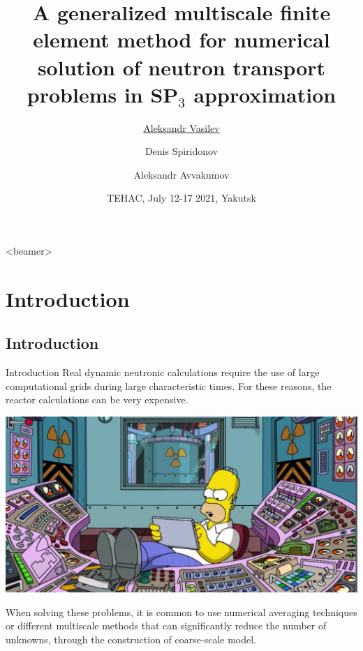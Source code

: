\documentclass[10pt,pdf,hyperref={unicode}]{beamer}
\title[] %
{
	A generalized multiscale finite element method for numerical solution of neutron transport problems in SP$_3$ approximation
}
\author[] %
{
	\underline{Aleksandr Vasilev \inst{1}} \\
	\and Denis Spiridonov \inst{1} 
	\and Aleksandr Avvakumov \inst{2}
}
\institute[] %
{
	\inst{1} North-Eastern Federal University, Yakutsk, Russia \\
	\inst{2} National Research Center \textquotedblleft Kurchatov Institute\grqq, Moscow, Russia
}
\date[July 12-17, 2021] %
{
	TEHAC, July 12-17 2021, Yakutsk
}
\begin{document}
\begin{frame}
	\titlepage
\end{frame}

{
	\begin{frame}<beamer>
		\tableofcontents
	\end{frame}
}

\section{Introduction}
\subsection{Introduction}
	\begin{frame}{Introduction}
		Real dynamic neutronic calculations require the use of large computational grids during large characteristic times. 
		For these reasons, the reactor calculations can be very expensive.
		\begin{center}
			\includegraphics[width=0.7\linewidth] {homer.jpg}	
		\end{center}
		When solving these problems, it is common to use numerical averaging techniques or different multiscale methods that can significantly reduce the number of unknowns, through the construction of coarse-scale model.
	\end{frame}
\end{document}

